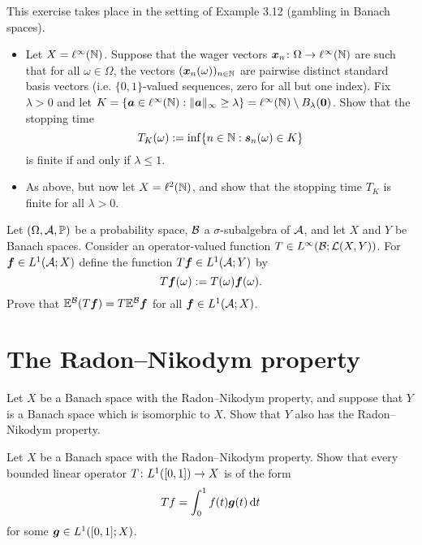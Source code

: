 \documentclass[a4paper,10pt]{amsbook}
\begin{document}
\begin{exercise}\label{ex:gambling-in-linfty}
  This exercise takes place in the setting of Example 3.12 (gambling in Banach spaces).
  \begin{itemize}
  \item
    Let $X = \ell^\infty(\mathbb{N})$.
    Suppose that the wager vectors $\bm{x}_n \colon \Omega \rightarrow \ell^\infty(\mathbb{N})$ are such that for all $\omega \in \Omega$, the vectors $(\bm{x}_n(\omega))_{n \in \mathbb{N}}$ are pairwise distinct standard basis vectors (i.e. $\{0,1\}$-valued sequences, zero for all but one index).
    Fix $\lambda > 0$ and let $K = \{\bm{a} \in \ell^\infty(\mathbb{N}) : \|\bm{a}\|_\infty \geq \lambda\} = \ell^\infty(\mathbb{N}) \setminus B_\lambda(\bm{0})$.
    Show that the stopping time
    \begin{equation*}
      T_K(\omega) := \inf\{n \in \mathbb{N} : \bm{s}_n(\omega) \in K\} 
    \end{equation*}
    is finite if and only if $\lambda \leq 1$.
  \item
    As above, but now let $X = \ell^2(\mathbb{N})$, and show that the stopping time $T_K$ is finite for all $\lambda > 0$.
  \end{itemize}
\end{exercise}

\begin{exercise}
  Let $(\Omega, \mathcal{A}, \mathbb{P})$ be a probability space, $\mathcal{B}$ a $\sigma$-subalgebra of $\mathcal{A}$, and let $X$ and $Y$ be Banach spaces.
  Consider an operator-valued function $T \in L^\infty(\mathcal{B}; \mathcal{L}(X,Y))$.
  For $\bm{f} \in L^1(\mathcal{A}; X)$ define the function $T\bm{f} \in L^1(\mathcal{A}; Y)$ by
  \begin{equation*}
    T\bm{f}(\omega) := T(\omega) \bm{f}(\omega).
  \end{equation*}
  Prove that $\mathbb{E}^{\mathcal{B}}(T\bm{f}) = T \mathbb{E}^{\mathcal{B}}\bm{f}$ for all $\bm{f} \in L^1(\mathcal{A};X)$.
\end{exercise}

\section{The Radon--Nikodym property}

\begin{exercise}
  Let $X$ be a Banach space with the Radon--Nikodym property, and suppose that $Y$ is a Banach space which is isomorphic to $X$.
  Show that $Y$ also has the Radon--Nikodym property.
\end{exercise}

\begin{exercise}
  Let $X$ be a Banach space with the Radon--Nikodym property.
  Show that every bounded linear operator $T \colon L^1([0,1]) \rightarrow X$ is of the form
  \begin{equation*}
    Tf = \int_0^1 f(t) \bm{g}(t) \, \mathrm{d} t
  \end{equation*}
  for some $\bm{g} \in L^1([0,1];X)$.
\end{exercise}
\end{document}
